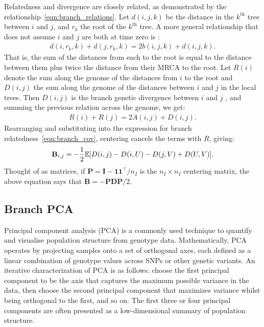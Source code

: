 Relatedness and divergence are closely related,
as demonstrated by the relationship~\eqref{eqn:branch_relations}.
%
Let $d(i,j,k)$ be the distance in the $k^\text{th}$ tree between $i$ and $j$,
and $r_k$ the root of the $k^\text{th}$ tree.
%
A more general relationship that does not assume $i$ and $j$ are both at time zero is
\citep{semple2003phylogenetics}:
%
\begin{align}
    d(i,r_k,k) + d(j,r_k,k) = 2 b(i,j,k) + d(i,j,k) .
\end{align}
%
That is, the sum of the distances from each to the root is
equal to the distance between them plus twice the distance from their MRCA to the root.
%
Let $R(i)$ denote the sum along the genome of the distances from $i$ to the root and
$D(i,j)$ the sum along the genome of the distances between $i$ and $j$ in the local trees.
%
Then $D(i,j)$ is the branch genetic divergence between $i$ and $j$ \citep{ralph2020efficiently},
and summing the previous relation across the genome, we get:
%
\begin{align} \label{eqn:divergence_relatedness}
    R(i) + R(j) = 2 A(i,j) + D(i,j) .
\end{align}
%
Rearranging and substituting into the expression for branch relatedness~\eqref{eqn:branch_cov},
centering cancels the terms with $R$, giving:
%
\begin{align}\label{eqn:divergence_relatedness_branch}
    \mathbf{B}_{i,j} = - \frac{1}{2} \mathbb{E}[D(i,j) - D(i,U) - D(j,V) + D(U,V)] .
\end{align}
%
Thought of as matrices, if $\mathbf{P}=\mathbf{I} - \mathbf{1}\mathbf{1}^\intercal / n_I$ is the $n_I \times n_I$
centering matrix, the above equation says that $\mathbf{B} = - \mathbf{P} \mathbf{D} \mathbf{P} / 2$.

\subsection{Branch PCA}

Principal component analysis (PCA) is a commonly used technique to quantify and visualise population structure from genotype data. Mathematically, PCA operates by projecting samples onto a set of orthogonal axes, each defined as a linear combination of genotype values across SNPs or other genetic variants. An iterative characterization of PCA is as follows: choose the first principal component to be the axis that captures the maximum possible variance in the data, then choose the second principal component that maximizes variance whilst being orthogonal to the first, and so on. The first three or four principal components are often presented as a low-dimensional summary of population structure.

